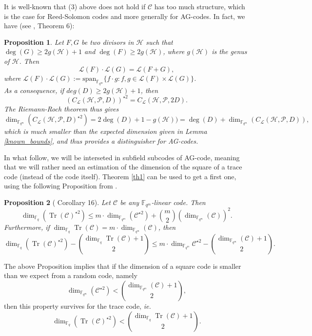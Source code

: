 \documentclass[a4paper]{article}
\newtheorem{prop1}{Proposition}
\newcommand{\calP}{\mathcal{P}}
\newcommand{\calH}{\mathcal{H}}
\newcommand{\calL}{\mathcal{L}}
\newcommand{\calC}{\mathcal{C}}
\newcommand{\Tr}{\operatorname{Tr}}
\newcommand{\fqm}{\mathbb{F}_{q^m}}
\newcommand{\fq}{\mathbb{F}_{q}}
\begin{document}
It is well-known that (3) above does not hold if $\calC$ has too much structure, which is the case for Reed-Solomon codes and more generally for AG-codes. In fact, we have (see \cite{mumford}, Theorem 6):

\begin{prop1} \label{prop1}
Let $F,G$ be two divisors in $\calH$ such that $\deg(G) \geq 2g(\calH)+1$ and $\deg(F) \geq 2g(\calH)$, where $g(\calH)$ is the genus of $\calH$. Then
\[ \calL(F) \cdot \calL(G) = \calL(F+G),\]
where $\calL(F) \cdot \calL(G) := \mathrm{span}_{\mathbb{F}_{q^m}}\{ f \cdot g : f,g \in \calL(F) \times \calL(G) \}$.\\ 
As a consequence, if $deg(D) \geq 2g(\calH)+1$, then 
\[ (C_{\calL}(\calH,\mathcal{P},D))^{\star2} = C_{\calL}(\calH,\calP,2D).\]
The Riemann-Roch theorem thus gives
\[ \dim_{\mathbb{F}_{q^m}}(C_{\calL}(\calH,\mathcal{P},D)^{\star2}) = 2\deg(D)+1-g(\calH)) = \deg(D) + \dim_{\fqm}(C_{\calL}(\calH,\mathcal{P},D)), \]
which is much smaller than the expected dimension given in Lemma \ref{known_bounds}, and thus provides a distinguisher for AG-codes.
\end{prop1}

In what follow, we will be interseted in subfield subcodes of AG-code, meaning that we will rather need an estimation of the dimension of the square of a trace code (instead of the code itself). Theorem \ref{th1} can be used to get a first one, using the following Proposition from \cite{rocco}.

\begin{prop1} [\cite{rocco} Corollary 16]\label{1st bound square of trace}
Let $\calC$ be any $\fqm$-linear code. Then 
\begin{equation} \label{bbbound}
    \dim_{\fq}(\Tr(\mathcal{C})^{\star2}) \leq m \cdot \dim_{\fqm}(\calC^{\star 2}) + \binom{m}{2} (\dim_{\fqm}(\calC))^2.
\end{equation}
Furthermore, if $\dim_{\fq} \Tr(\calC) = m \cdot \dim_{\fqm}(\calC)$, then 
\[\dim_{\fq} (\Tr(\calC)^{\star 2}) - \binom{\dim_{\fq} \Tr(\calC)+1}{2} \leq m \cdot \dim_{\fqm} \calC^{\star 2} - \binom{\dim_{\fqm} (\calC)+1}{2}.\]
\end{prop1}

The above Proposition implies that if the dimension of a square code is smaller than we expect from a random code, namely
\[ \dim_{\fqm} (\calC^{\star 2}) < \binom{\dim_{\fqm} (\calC)+1}{2},\]
then this property survives for the trace code, \emph{ie.}
\[\dim_{\fq} (\Tr(\calC)^{\star 2}) < \binom{\dim_{\fq} \Tr(\calC)+1}{2}.\]
\end{document}
